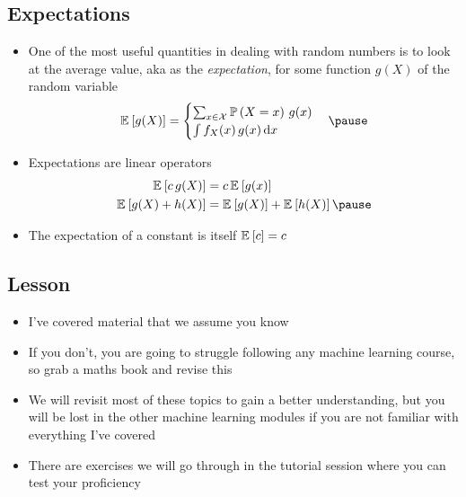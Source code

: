 
\begin{slide}
\section[-2]{Expectations}

\begin{PauseHighLight}
  \begin{itemize}
  \item One of the most useful quantities in dealing with random
    numbers is to look at the average value, aka as the
    \emph{expectation}, for some function $g(X)$ of the random variable
    \begin{align*}
      \av{g(X)} =
      \begin{cases}
        \sum_{x\in \mathcal{X}} \Prob{X=x} \, g(x) \\
        \int f_X(x) \, g(x) \, \dd x
      \end{cases}\pause
    \end{align*}
  \item Expectations are linear operators
    \begin{align*}
      \av{c\, g(X)} &= c\, \av{g(x)} \\ \av{g(X) + h(X)} &= \av{g(X)} + \av{h(X)}\pause
    \end{align*}
  \item The expectation of a constant is itself $\mathbb{E}_{}\left[ c \right] = c$ \pause
  \end{itemize}
\end{PauseHighLight}

\end{slide}


\begin{slide}
\section{Lesson}

\begin{PauseHighLight}
  \begin{itemize}
  \item I've covered material that we assume you know\pause
  \item If you don't, you are going to struggle following any machine
    learning course, so grab a maths book and revise this\pause
  \item We will revisit most of these topics to gain a better
    understanding, but you will be lost in the other machine learning
    modules if you are not familiar with everything I've covered\pause
  \item There are exercises we will go through in the tutorial session
    where you can test your proficiency\pause
  \end{itemize}
\end{PauseHighLight}

\end{slide}



